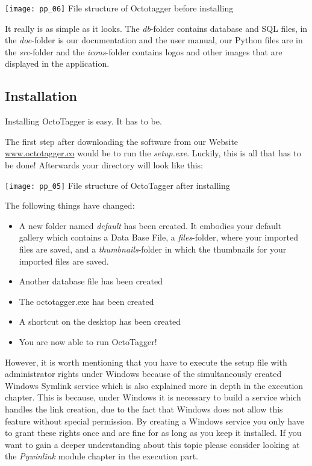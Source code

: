 \begin{center}
\texttt{[image: pp\_06]}
\small{File structure of Octotagger before installing}
\end{center}

It really is as simple as it looks. The \textit{db}-folder contains database and SQL files, in the \textit{doc}-folder is our documentation and the user manual, our Python files are in the \textit{src}-folder and the \textit{icons}-folder contains logos and other images that are displayed in the application.

\subsection{Installation}
Installing OctoTagger is easy. It has to be. 

The first step after downloading the software from our Website \href{"http://www.octotagger.co/"}{www.octotagger.co} would be to run the \textit{setup.exe}. Luckily, this is all that has to be done! Afterwards your directory will look like this:

\begin{center}
\texttt{[image: pp\_05]}
\small{File structure of OctoTagger after installing}
\end{center}


The following things have changed:
\begin{itemize}
	\item A new folder named \textit{default} has been created. It embodies your default gallery which contains a Data Base File, a \textit{files}-folder, where your imported files are saved, and a \textit{thumbnails}-folder in which the thumbnails for your imported files are saved.
	\item Another database file has been created
	\item The octotagger.exe has been created
	\item A shortcut on the desktop has been created
	\item You are now able to run OctoTagger!
\end{itemize}

However, it is worth mentioning that you have to execute the setup file with administrator rights under Windows because of the simultaneously created Windows Symlink service which is also explained more in depth in the execution chapter. This is because, under Windows it is necessary to build a service which handles the link creation, due to the fact that Windows does not allow this feature without special permission. By creating a Windows service you only have to grant these rights once and are fine for as long as you keep it installed. If you want to gain a deeper understanding about this topic please consider looking at the \textit{Pywinlink} module chapter in the execution part.


